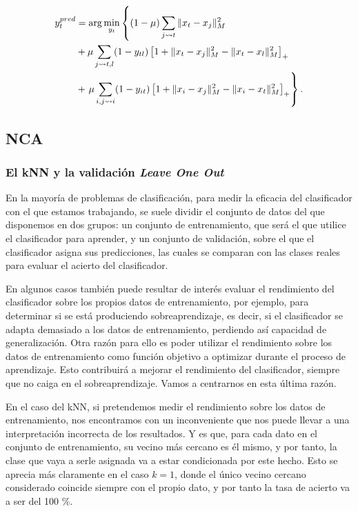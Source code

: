 \begin{equation}
\begin{split}
 y_t^{pred} &= \arg\min_{y_t} \left\{ (1-\mu) \sum_{j \rightsquigarrow t} \|x_t-x_j\|_M^2 \right. \\
            &+ \mu \sum_{j \rightsquigarrow t,l} (1-y_{tl})\left[ 1 + \|x_t-x_j\|_M^2 - \|x_t-x_l\|_M^2\right]_+  \\
            &+ \left. \mu \sum_{i,j \rightsquigarrow i}(1 - y_{it}) \left[ 1 + \|x_i-x_j\|_M^2 - \|x_i-x_t\|_M^2\right]_+ \right\} .
\end{split}
\end{equation}

\subsection{NCA}

\subsubsection{El kNN y la validación \emph{Leave One Out}}

En la mayoría de problemas de clasificación, para medir la eficacia del clasificador con el que estamos trabajando, se suele dividir el conjunto de datos del que disponemos en dos grupos: un conjunto de entrenamiento, que será el que utilice el clasificador para aprender, y un conjunto de validación, sobre el que el clasificador asigna sus predicciones, las cuales se comparan con las clases reales para evaluar el acierto del clasificador.

En algunos casos también puede resultar de interés evaluar el rendimiento del clasificador sobre los propios datos de entrenamiento, por ejemplo, para determinar si se está produciendo sobreaprendizaje, es decir, si el clasificador se adapta demasiado a los datos de entrenamiento, perdiendo así capacidad de generalización. Otra razón para ello es poder utilizar el rendimiento sobre los datos de entrenamiento como función objetivo a optimizar durante el proceso de aprendizaje. Esto contribuirá a mejorar el rendimiento del clasificador, siempre que no caiga en el sobreaprendizaje. Vamos a centrarnos en esta última razón.

En el caso del kNN, si pretendemos medir el rendimiento sobre los datos de entrenamiento, nos encontramos con un inconveniente que nos puede llevar a una interpretación incorrecta de los resultados. Y es que, para cada dato en el conjunto de entrenamiento, su vecino más cercano es él mismo, y por tanto, la clase que vaya a serle asignada va a estar condicionada por este hecho. Esto se aprecia más claramente en el caso $k=1$, donde el único vecino cercano considerado coincide siempre con el propio dato, y por tanto la tasa de acierto va a ser del 100 \%.

